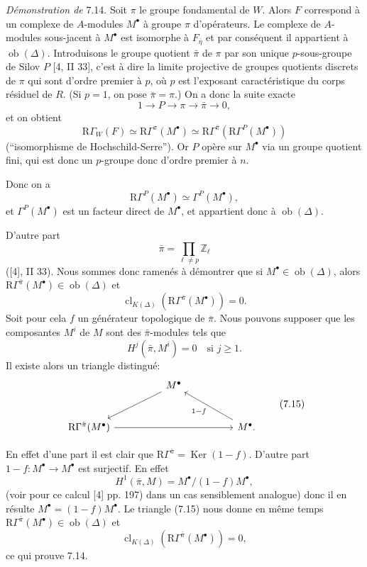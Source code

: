 \documentclass[11pt]{article}
\providecommand{\Ker}{\operatorname{Ker}}
\providecommand{\Ob}{\operatorname{ob}}
\providecommand{\Ker}{\operatorname{Ker}}
\providecommand{\Ker}{\operatorname{Ker}}
\providecommand{\Ob}{\operatorname{ob}}
\providecommand{\Ob}{\operatorname{Ob}}
\providecommand{\clK}[1]{\operatorname{cl}_{K(#1)}}
\providecommand{\Ob}{\operatorname{ob}}
\providecommand{\Ob}{\operatorname{Ob}}
\begin{document}
\emph{Démonstration de} 7.14. Soit $\pi$ le groupe fondamental de $W$. Alors $F$ correspond à un complexe de $A$-modules $M^\bullet$ à groupe $\pi$ d'opérateurs. Le complexe de $A$-modules sous-jacent à $M^\bullet$ est isomorphe à $F_{\bar\eta}$ et par conséquent il appartient à $\Ob(\Delta)$. Introduisons le groupe quotient $\bar\pi$ de $\pi$ par son unique $p$-sous-groupe de Silov $P$ [4, II 33], c'est à dire la limite projective de groupes quotients discrets de $\pi$ qui sont d'ordre premier à $p$, où $p$ est l'exposant caractéristique du corps résiduel de $R$. (Si $p=1$, on pose $\bar\pi=\pi$.) On a donc la suite exacte
\[
1\longrightarrow P\longrightarrow \pi\longrightarrow \bar\pi\longrightarrow0,
\]
et on obtient
\[
\mathrm{R}\Gamma_W(F)\simeq \mathrm{R}\Gamma^\pi(M^\bullet)
\simeq \mathrm{R}\Gamma^{\bar\pi}(\mathrm{R}\Gamma^P(M^\bullet))
\]
(``isomorphisme de Hochschild-Serre''). Or $P$ opère sur $M^\bullet$ via un groupe quotient fini, qui est donc un $p$-groupe donc d'ordre premier à $n$.

Donc on a
\[
\mathrm{R}\Gamma^P(M^\bullet)\simeq \Gamma^P(M^\bullet),
\]
et $\Gamma^P(M^\bullet)$ est un facteur direct de $M^\bullet$, et appartient donc à $\Ob(\Delta)$.

D'autre part
\[
\bar\pi=\prod_{\ell\ne p}\mathbb Z_\ell
\]
([4], II 33). Nous sommes donc ramenés à démontrer que si $M^\bullet\in\Ob(\Delta)$, alors $\mathrm{R}\Gamma^{\bar\pi}(M^\bullet)\in\Ob(\Delta)$ et
\[
\clK{\Delta}(\mathrm{R}\Gamma^{\bar\pi}(M^\bullet))=0.
\]
Soit pour cela $f$ un générateur topologique de $\bar\pi$. Nous pouvons supposer que les composantes $M^i$ de $M$ sont des $\bar\pi$-modules tels que
\[
H^j(\bar\pi,M^i)=0\quad\text{si }j\ge1.
\]
Il existe alors un triangle distingué:
\[
\begin{tikzcd}[column sep=huge,row sep=large]
& M^\bullet \arrow[dl] &\\
\mathrm{R}\Gamma^{\bar\pi}(M^\bullet) \arrow[rr] && M^\bullet \arrow[ul,"1-f"].
\end{tikzcd}
\tag{7.15}
\]

En effet d'une part il est clair que $\mathrm{R}\Gamma^{\bar\pi}=\Ker(1-f)$. D'autre part $1-f:M^\bullet\to M^\bullet$ est surjectif. En effet
\[
H^1(\bar\pi,M)=M^\bullet/(1-f)M^\bullet,
\]
(voir pour ce calcul [4] pp. 197) dans un cas sensiblement analogue) donc il en résulte $M^\bullet=(1-f)M^\bullet$. Le triangle (7.15) nous donne en même temps $\mathrm{R}\Gamma^{\bar\pi}(M^\bullet)\in\Ob(\Delta)$ et
\[
\clK{\Delta}(\mathrm{R}\Gamma^{\bar\pi}(M^\bullet))=0,
\]
ce qui prouve 7.14.
\end{document}
